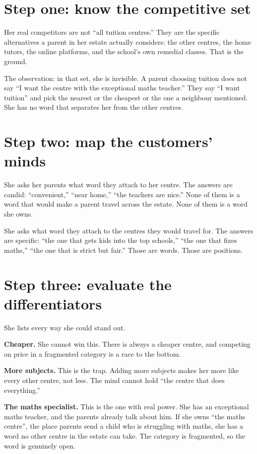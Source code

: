 \documentclass[10pt,twoside,openany]{memoir}
\newcommand{\needspacehead}{\needspace{4\baselineskip}}
\let\oldsection\section
\renewcommand{\section}{\needspacehead\oldsection}
\begin{document}
{\section{Step one: know the competitive
set}\label{step-one-know-the-competitive-set}

Her real competitors are not ``all tuition centres.'' They are the
specific alternatives a parent in her estate actually considers: the
other centres, the home tutors, the online platforms, and the school's
own remedial classes. That is the ground.

The observation: in that set, she is invisible. A parent choosing
tuition does not say ``I want the centre with the exceptional maths
teacher.'' They say ``I want tuition'' and pick the nearest or the
cheapest or the one a neighbour mentioned. She has no word that
separates her from the other centres.

\section{Step two: map the customers'
minds}\label{step-two-map-the-customers-minds-1}

She asks her parents what word they attach to her centre. The answers
are candid: ``convenient,'' ``near home,'' ``the teachers are nice.''
None of them is a word that would make a parent travel across the
estate. None of them is a word she owns.

She asks what word they attach to the centres they would travel for. The
answers are specific: ``the one that gets kids into the top schools,''
``the one that fixes maths,'' ``the one that is strict but fair.'' Those
are words. Those are positions.

\section{Step three: evaluate the
differentiators}\label{step-three-evaluate-the-differentiators-1}

She lists every way she could stand out.

\textbf{Cheaper.} She cannot win this. There is always a cheaper centre,
and competing on price in a fragmented category is a race to the bottom.

\textbf{More subjects.} This is the trap. Adding more subjects makes her
more like every other centre, not less. The mind cannot hold ``the
centre that does everything.''

\textbf{The maths specialist.} This is the one with real power. She has
an exceptional maths teacher, and the parents already talk about him. If
she owns ``the maths centre'', the place parents send a child who is
struggling with maths, she has a word no other centre in the estate can
take. The category is fragmented, so the word is genuinely open.

}
\end{document}
